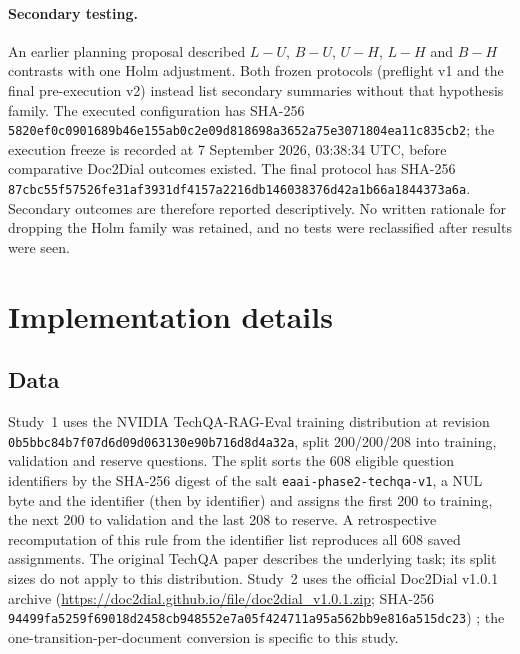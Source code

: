 \paragraph{Secondary testing.} An earlier planning proposal described $L-U$, $B-U$, $U-H$, $L-H$ and $B-H$ contrasts with one Holm adjustment. Both frozen protocols (preflight v1 and the final pre-execution v2) instead list secondary summaries without that hypothesis family. The executed configuration has SHA-256 \nolinkurl{5820ef0c0901689b46e155ab0c2e09d818698a3652a75e3071804ea11c835cb2}; the execution freeze is recorded at 7 September 2026, 03:38:34 UTC, before comparative Doc2Dial outcomes existed. The final protocol has SHA-256 \nolinkurl{87cbc55f57526fe31af3931df4157a2216db146038376d42a1b66a1844373a6a}. Secondary outcomes are therefore reported descriptively. No written rationale for dropping the Holm family was retained, and no tests were reclassified after results were seen.

\section{Implementation details}\label{supp:impl}
\subsection{Data}
Study~1 uses the NVIDIA TechQA-RAG-Eval training distribution at revision \nolinkurl{0b5bbc84b7f07d6d09d063130e90b716d8d4a32a}, split 200/200/208 into training, validation and reserve questions. The split sorts the 608 eligible question identifiers by the SHA-256 digest of the salt \nolinkurl{eaai-phase2-techqa-v1}, a NUL byte and the identifier (then by identifier) and assigns the first 200 to training, the next 200 to validation and the last 208 to reserve. A retrospective recomputation of this rule from the identifier list reproduces all 608 saved assignments. The original TechQA paper \citep{castelli2020} describes the underlying task; its split sizes do not apply to this distribution. Study~2 uses the official Doc2Dial v1.0.1 archive (\url{https://doc2dial.github.io/file/doc2dial_v1.0.1.zip}; SHA-256 \nolinkurl{94499fa5259f69018d2458cb948552e7a05f424711a95a562bb9e816a515dc23}) \citep{feng2020}; the one-transition-per-document conversion is specific to this study.

